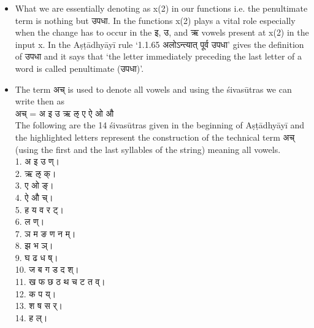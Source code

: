 \begin{itemize}
    \item 

What we are essentially denoting as x(2) in our functions i.e. the penultimate term is nothing but \texthindi{उपधा.} In the functions x(2) plays a vital role especially when the change has to occur in the \texthindi{इ}, \texthindi{उ}, and \texthindi{ऋ} vowels present at x(2) in the input x. In the Aṣṭādhyāyī rule ‘1.1.65 \texthindi{अलोऽन्त्यात् पूर्व उपधा}’ gives the definition of \texthindi{उपधा }and it says that ‘the letter immediately preceding the last letter of a word is called penultimate (\texthindi{उपधा})’.
\item 	The term \texthindi{अच्} is used to denote all vowels and using the śivasūtras we can write then as\\
 \texthindi{अच् = अ इ उ ऋ ऌ ए ऐ ओ औ}\\
The following are the 14 śivasūtras given in the beginning of Aṣṭādhyāyī and the highlighted letters represent the construction of the technical term \texthindi{अच्} (using the first and the last syllables of the string) meaning all vowels.\\
 
1. \texthindi{अ इ उ ण्।}\\
2. \texthindi{ऋ ऌ क्।}\\
3. \texthindi{ए ओ ङ्।}\\
4. \texthindi{ऐ औ च्।}\\
5. \texthindi{ह य व र ट्।}\\
6. \texthindi{ल ण्।}\\
7. \texthindi{ञ म ङ ण न म्।}\\
8. \texthindi{झ भ ञ्।}\\
9. \texthindi{घ ढ ध ष्।}\\
10. \texthindi{ज ब ग ड द श्।}\\
11. \texthindi{ख फ छ ठ थ च ट त व्।}\\
12. \texthindi{क प य्।}\\
13. \texthindi{श ष स र्।}\\
14. \texthindi{ह ल्।}\\
 

\end{itemize}
